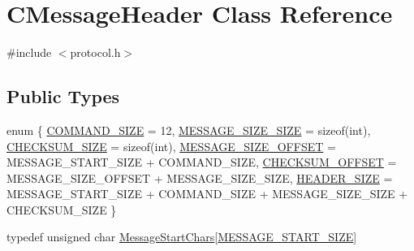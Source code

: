 \hypertarget{class_c_message_header}{}\section{C\+Message\+Header Class Reference}
\label{class_c_message_header}


{\ttfamily \#include $<$protocol.\+h$>$}

\subsection*{Public Types}
\begin{DoxyCompactItemize}
\item 
enum \{ \newline
\mbox{\hyperlink{class_c_message_header_a44037297cb6e6b432e2386c351ce05dda8c1bfc0fa6a63c8b73abef30555a5e54}{C\+O\+M\+M\+A\+N\+D\+\_\+\+S\+I\+ZE}} = 12, 
\mbox{\hyperlink{class_c_message_header_a44037297cb6e6b432e2386c351ce05dda223ee9c2e0e31d0afe31c713b41400d2}{M\+E\+S\+S\+A\+G\+E\+\_\+\+S\+I\+Z\+E\+\_\+\+S\+I\+ZE}} = sizeof(int), 
\mbox{\hyperlink{class_c_message_header_a44037297cb6e6b432e2386c351ce05ddac92b66287a05d5c96bf494ff5a48e726}{C\+H\+E\+C\+K\+S\+U\+M\+\_\+\+S\+I\+ZE}} = sizeof(int), 
\mbox{\hyperlink{class_c_message_header_a44037297cb6e6b432e2386c351ce05dda73cc507b1a2c32fba10305201e40f2b3}{M\+E\+S\+S\+A\+G\+E\+\_\+\+S\+I\+Z\+E\+\_\+\+O\+F\+F\+S\+ET}} = M\+E\+S\+S\+A\+G\+E\+\_\+\+S\+T\+A\+R\+T\+\_\+\+S\+I\+ZE + C\+O\+M\+M\+A\+N\+D\+\_\+\+S\+I\+ZE, 
\newline
\mbox{\hyperlink{class_c_message_header_a44037297cb6e6b432e2386c351ce05ddad4e76479ab116367800a146dbb299393}{C\+H\+E\+C\+K\+S\+U\+M\+\_\+\+O\+F\+F\+S\+ET}} = M\+E\+S\+S\+A\+G\+E\+\_\+\+S\+I\+Z\+E\+\_\+\+O\+F\+F\+S\+ET + M\+E\+S\+S\+A\+G\+E\+\_\+\+S\+I\+Z\+E\+\_\+\+S\+I\+ZE, 
\mbox{\hyperlink{class_c_message_header_a44037297cb6e6b432e2386c351ce05ddadd8582d526addef583c978e5261dfec1}{H\+E\+A\+D\+E\+R\+\_\+\+S\+I\+ZE}} = M\+E\+S\+S\+A\+G\+E\+\_\+\+S\+T\+A\+R\+T\+\_\+\+S\+I\+ZE + C\+O\+M\+M\+A\+N\+D\+\_\+\+S\+I\+ZE + M\+E\+S\+S\+A\+G\+E\+\_\+\+S\+I\+Z\+E\+\_\+\+S\+I\+ZE + C\+H\+E\+C\+K\+S\+U\+M\+\_\+\+S\+I\+ZE
 \}
\item 
typedef unsigned char \mbox{\hyperlink{class_c_message_header_a0d0eeb540cbf4087973f6652ad61878f}{Message\+Start\+Chars}}\mbox{[}\mbox{\hyperlink{protocol_8h_a6bcadada595cc3da13e6a04be1715917}{M\+E\+S\+S\+A\+G\+E\+\_\+\+S\+T\+A\+R\+T\+\_\+\+S\+I\+ZE}}\mbox{]}
\end{DoxyCompactItemize}
